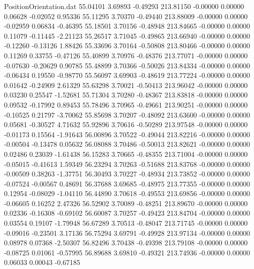 \begin{filecontents}{PositionOrientation.dat}
  55.04101    3.69893   -0.49293   213.81150   -0.00000    0.00000    0.06628   -0.02052    0.95336
  55.11295    3.70370   -0.49440   213.88009   -0.00000    0.00000   -0.02959    0.06834   -0.46395
  55.18501    3.70156   -0.48948   213.84665   -0.00000    0.00000    0.11079   -0.11445   -2.21123
  55.26517    3.71045   -0.49865   213.66940   -0.00000    0.00000   -0.12260   -0.13126    1.88426
  55.33696    3.70164   -0.50808   213.80466   -0.00000    0.00000    0.11269    0.33755   -0.47126
  55.40899    3.70976   -0.48376   213.77071   -0.00000    0.00000   -0.07630   -0.20629    0.90785
  55.48899    3.70366   -0.50026   213.84334   -0.00000    0.00000   -0.06434    0.19550   -0.98770
  55.56097    3.69903   -0.48619   213.77224   -0.00000    0.00000    0.01642   -0.24909    2.61329
  55.63298    3.70021   -0.50413   213.96042   -0.00000    0.00000    0.03230    0.25547   -1.52681
  55.71304    3.70280   -0.48367   213.83818   -0.00000    0.00000    0.09532   -0.17992    0.89453
  55.78496    3.70965   -0.49661   213.90251   -0.00000    0.00000   -0.10525    0.21797   -3.70062
  55.85698    3.70207   -0.48092   213.63600   -0.00000    0.00000    0.05681   -0.30527    4.71632
  55.92896    3.70616   -0.50289   213.97548   -0.00000    0.00000   -0.01173    0.15564   -1.91643
  56.00896    3.70522   -0.49044   213.82216   -0.00000    0.00000   -0.00504   -0.13478    0.05632
  56.08088    3.70486   -0.50013   213.82621   -0.00000    0.00000    0.02486    0.23039   -1.61438
  56.15283    3.70665   -0.48355   213.71004   -0.00000    0.00000   -0.05015   -0.41613    1.59349
  56.23294    3.70263   -0.51688   213.83768   -0.00000    0.00000   -0.00509    0.38263   -1.37751
  56.30493    3.70227   -0.48934   213.73852   -0.00000    0.00000   -0.07524   -0.00567    0.48691
  56.37688    3.69685   -0.48975   213.77355   -0.00000    0.00000    0.12954   -0.08029   -1.04110
  56.44890    3.70618   -0.49553   213.69856   -0.00000    0.00000   -0.06605    0.16252    2.47326
  56.52902    3.70089   -0.48251   213.89670   -0.00000    0.00000    0.02336   -0.16308   -0.69102
  56.60087    3.70257   -0.49423   213.84704   -0.00000    0.00000    0.03554    0.19107   -1.79948
  56.67289    3.70513   -0.48047   213.71745   -0.00000    0.00000   -0.09016   -0.23501    3.17136
  56.75294    3.69791   -0.49928   213.97134   -0.00000    0.00000    0.08978    0.07368   -2.50307
  56.82496    3.70438   -0.49398   213.79108   -0.00000    0.00000   -0.08725    0.01061   -0.57995
  56.89688    3.69810   -0.49321   213.74936   -0.00000    0.00000    0.06033    0.00043   -0.67185

\end{filecontents}
